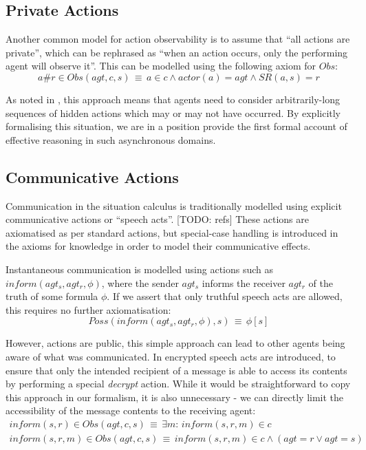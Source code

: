 \subsection{Private Actions}

Another common model for action observability is to assume that {}``all
actions are private'', which can be rephrased as {}``when an action
occurs, only the performing agent will observe it''. This can be
modelled using the following axiom for $Obs$:\[
a\#r\in Obs(agt,c,s)\,\equiv\, a\in c\wedge actor(a)=agt\wedge SR(a,s)=r\]


As noted in \citep{Lesperance99sitcalc_approach}, this approach means
that agents need to consider arbitrarily-long sequences of hidden
actions which may or may not have occurred. By explicitly formalising
this situation, we are in a position provide the first formal account
of effective reasoning in such asynchronous domains.


\subsection{Communicative Actions}

Communication in the situation calculus is traditionally modelled
using explicit communicative actions or {}``speech acts''. {[}TODO:
refs] These actions are axiomatised as per standard actions, but special-case
handling is introduced in the axioms for knowledge in order to model
their communicative effects.

Instantaneous communication is modelled using actions such as $inform(agt_{s},agt_{r},\phi)$,
where the sender $agt_{s}$ informs the receiver $agt_{r}$ of the
truth of some formula $\phi$. If we assert that only truthful speech
acts are allowed, this requires no further axiomatisation:\[
Poss(inform(agt_{s},agt_{r},\phi),s)\,\equiv\,\phi[s]\]


However, actions are public, this simple approach can lead to other
agents being aware of what was communicated. In \citep{shapiro01casl_feat_inter}
encrypted speech acts are introduced, to ensure that only the intended
recipient of a message is able to access its contents by performing
a special \emph{decrypt} action. While it would be straightforward
to copy this approach in our formalism, it is also unnecessary - we
can directly limit the accessibility of the message contents to the
receiving agent:\begin{gather*}
inform(s,r)\in Obs(agt,c,s)\,\equiv\,\exists m:\, inform(s,r,m)\in c\\
inform(s,r,m)\in Obs(agt,c,s)\,\equiv\, inform(s,r,m)\in c\wedge\left(agt=r\vee agt=s\right)\end{gather*}


